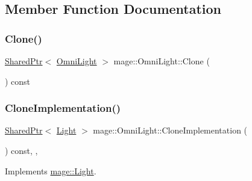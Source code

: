 \subsection{Member Function Documentation}
\hypertarget{classmage_1_1_omni_light_a942f31912bac5f56b37f1ebca7ff09ad}{}\label{classmage_1_1_omni_light_a942f31912bac5f56b37f1ebca7ff09ad} 
\subsubsection{\texorpdfstring{Clone()}{Clone()}}
{\footnotesize\ttfamily \hyperlink{namespacemage_a1e01ae66713838a7a67d30e44c67703e}{Shared\+Ptr}$<$ \hyperlink{classmage_1_1_omni_light}{Omni\+Light} $>$ mage\+::\+Omni\+Light\+::\+Clone (\begin{DoxyParamCaption}{ }\end{DoxyParamCaption}) const}

\hypertarget{classmage_1_1_omni_light_ac2f028466785d00ab8be1754e4acc516}{}\label{classmage_1_1_omni_light_ac2f028466785d00ab8be1754e4acc516} 
\subsubsection{\texorpdfstring{Clone\+Implementation()}{CloneImplementation()}}
{\footnotesize\ttfamily \hyperlink{namespacemage_a1e01ae66713838a7a67d30e44c67703e}{Shared\+Ptr}$<$ \hyperlink{classmage_1_1_light}{Light} $>$ mage\+::\+Omni\+Light\+::\+Clone\+Implementation (\begin{DoxyParamCaption}{ }\end{DoxyParamCaption}) const\hspace{0.3cm}{\ttfamily [override]}, {\ttfamily [private]}, {\ttfamily [virtual]}}



Implements \hyperlink{classmage_1_1_light_a53ef28bad86a1a307db90cb265db4798}{mage\+::\+Light}.

\hypertarget{classmage_1_1_omni_light_ac3a8638331aa35ffd8967ccc78ca2df7}{}\label{classmage_1_1_omni_light_ac3a8638331aa35ffd8967ccc78ca2df7} 

